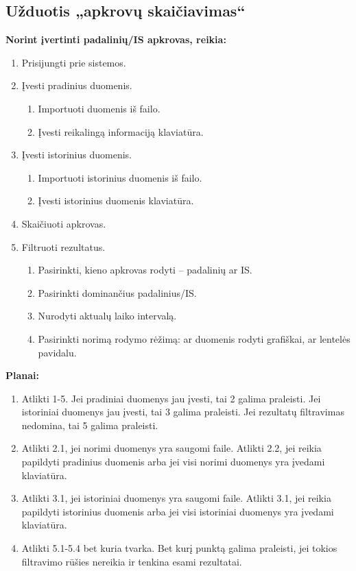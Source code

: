 \subsection{Užduotis „apkrovų skaičiavimas“}

\textbf{Norint įvertinti padalinių/IS apkrovas, reikia:}
\begin{enumerate}
  \item Prisijungti prie sistemos.
  
  \item Įvesti pradinius duomenis.
  \begin{enumerate}
    \item Importuoti duomenis iš failo.
    \item Įvesti reikalingą informaciją klaviatūra.
  \end{enumerate}
  
  \item Įvesti istorinius duomenis.
  \begin{enumerate}
    \item Importuoti istorinius duomenis iš failo.
    \item Įvesti istorinius duomenis klaviatūra.
  \end{enumerate}
  
  \item Skaičiuoti apkrovas.
  \item Filtruoti rezultatus.
  \begin{enumerate}
    \item Pasirinkti, kieno apkrovas rodyti – padalinių ar IS.
    \item Pasirinkti dominančius padalinius/IS.
    \item Nurodyti aktualų laiko intervalą.
    \item Pasirinkti norimą rodymo rėžimą: ar duomenis rodyti grafiškai, ar lentelės pavidalu.
  \end{enumerate}
\end{enumerate}

\vspace{1cm}
\textbf{Planai:}
\begin{enumerate}
  \item Atlikti 1-5. Jei pradiniai duomenys jau įvesti, tai 2 galima praleisti.
  Jei istoriniai duomenys jau įvesti, tai 3 galima praleisti.
  Jei rezultatų filtravimas nedomina, tai 5 galima praleisti.
  
  \item Atlikti 2.1, jei norimi duomenys yra saugomi faile. Atlikti 2.2, jei reikia papildyti
  pradinius duomenis arba jei visi norimi duomenys yra įvedami klaviatūra.
  
  \item Atlikti 3.1, jei istoriniai duomenys yra saugomi faile. Atlikti 3.1, jei reikia papildyti
  istorinius duomenis arba jei visi istoriniai duomenys yra įvedami klaviatūra.
  
  \item Atlikti 5.1-5.4 bet kuria tvarka. Bet kurį punktą galima praleisti, jei tokios filtravimo
  rūšies nereikia ir tenkina esami rezultatai.
\end{enumerate}

